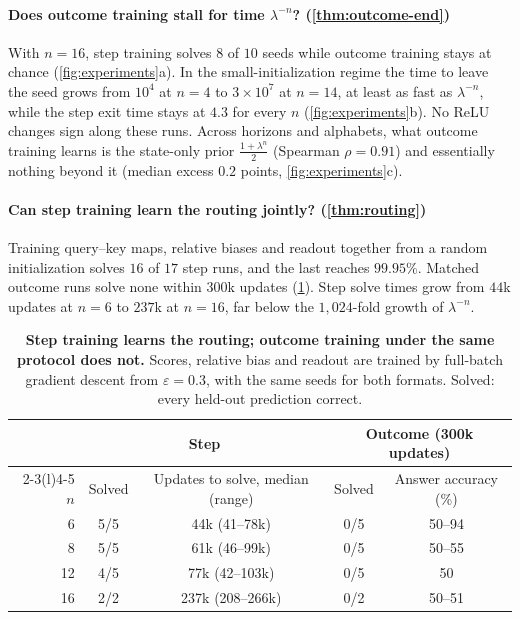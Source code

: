 \paragraph{Does outcome training stall for time $\lambda^{-n}$? (\cref{thm:outcome-end})} With $n=16$, step training solves
$8$ of $10$ seeds while outcome training stays at chance (\cref{fig:experiments}a). In the small-initialization
regime the time to leave the seed grows from $10^4$ at $n=4$ to $3\times10^7$ at $n=14$, at least as fast as
$\lambda^{-n}$, while the step exit time stays at $4.3$ for every $n$ (\cref{fig:experiments}b). No ReLU changes sign
along these runs. Across horizons and alphabets, what outcome training learns is the state-only prior
$\frac{1+\lambda^n}2$ (Spearman $\rho=0.91$) and essentially nothing beyond it (median excess $0.2$ points,
\cref{fig:experiments}c).

\paragraph{Can step training learn the routing jointly? (\cref{thm:routing})} Training query--key maps, relative biases and readout
together from a random initialization solves $16$ of $17$ step runs, and the last reaches $99.95\%$. Matched outcome
runs solve none within $300$k updates (\cref{tab:reach}). Step solve times grow from $44$k updates at $n=6$ to
$237$k at $n=16$, far below the $1{,}024$-fold growth of $\lambda^{-n}$.

\begin{table}[t]
\caption{\textbf{Step training learns the routing; outcome training under the same protocol does not.}
Scores, relative bias and readout are trained by full-batch gradient descent from $\varepsilon=0.3$, with the same seeds for both
formats. Solved: every held-out prediction correct.}
\label{tab:reach}
\centering\small
\begin{tabular}{@{}rcccc@{}}
\toprule
 & \multicolumn{2}{c}{Step} & \multicolumn{2}{c}{Outcome (300k updates)}\\
\cmidrule(lr){2-3}\cmidrule(l){4-5}
$n$ & Solved & Updates to solve, median (range) & Solved & Answer accuracy (\%)\\
\midrule
6  & 5/5 & 44k (41--78k)   & 0/5 & 50--94\\
8  & 5/5 & 61k (46--99k)   & 0/5 & 50--55\\
12 & 4/5 & 77k (42--103k)  & 0/5 & 50\\
16 & 2/2 & 237k (208--266k) & 0/2 & 50--51\\
\bottomrule
\end{tabular}
\end{table}

